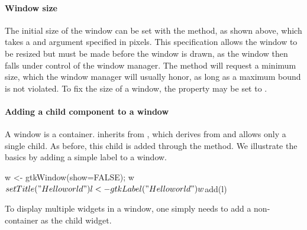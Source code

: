 \paragraph{Window size}
The initial size of the window can be set with the
 method, as shown above, which takes a
 and  argument
specified in pixels. This specification allows the window to be
resized but must be made before the window is drawn, as the window
then falls under control of the window manager. The
 method will request a minimum size,
which the window manager will usually honor, as long as a maximum
bound is not violated. To fix the size of a window, the
 property may be set to .

\paragraph{Adding a child component to a window}
A window is a container.  inherits from
, which derives from  and allows
only a single child. As before, this child is added through the
 method. 
We illustrate the basics by adding a simple label to a window.
\begin{Schunk}
\begin{Sinput}
 w <- gtkWindow(show=FALSE); w$setTitle("Hello world")
 l <- gtkLabel("Hello world")
 w$add(l)
\end{Sinput}
\end{Schunk}
%
To display multiple widgets in a
window, one simply needs to add a non- container as the
child widget.

